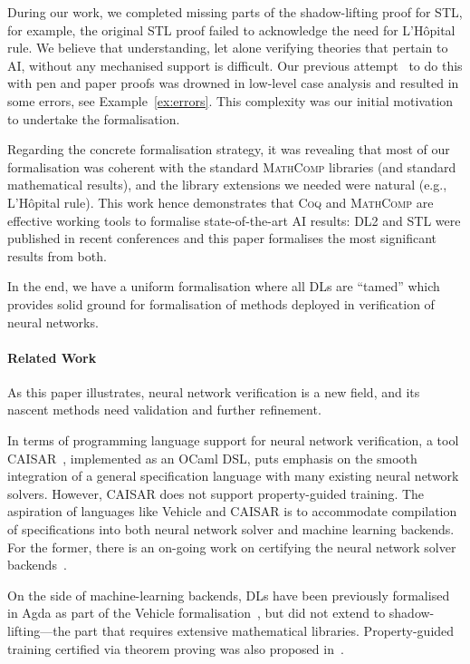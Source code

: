 \documentclass[a4paper,UKenglish,cleveref, autoref, thm-restate]{lipics-v2021}
\def\DLtwo{\textrm{DL2}}
\def\STL{\textrm{STL}}
\def\coq{\textsc{Coq}}
\def\mathcomp{\textsc{MathComp}}
\begin{document}
During our work, we completed missing parts of the shadow-lifting
proof for \STL{}, for example, the original \STL{} proof failed to
acknowledge the need for L'Hôpital rule.
%
We believe that understanding, let alone verifying theories that
pertain to AI, without any mechanised support is difficult.
%
Our previous attempt~\cite{ldl} to do this with pen and paper proofs
was drowned in low-level case analysis and resulted in some errors,
see Example~\ref{ex:errors}.  This complexity was our initial
motivation to undertake the formalisation.

Regarding the concrete formalisation strategy, it was revealing that
most of our formalisation was coherent with the standard \mathcomp{}
libraries (and standard mathematical results), and the library
extensions we needed were natural (e.g., L'Hôpital rule).  This
work hence demonstrates that \coq{} and \mathcomp{} are effective
working tools to formalise state-of-the-art AI results: \DLtwo{} and \STL{}
were published in recent conferences\cite{varnai,fischer2019dl2} and
this paper formalises the most significant results from both.

In the end, we have a uniform formalisation where all DLs are “tamed” which 
provides 
solid ground for formalisation of methods deployed in verification of neural 
networks.

\paragraph*{Related Work} 
As this paper illustrates, neural network verification is a new field,
and its nascent methods need validation and further refinement.

In terms of programming language support for neural network verification, 
a tool CAISAR~\cite{girardsatabin2022caisar}, implemented as an OCaml DSL, 
puts emphasis on the smooth integration of a general specification language 
with many existing neural network solvers. 
However, CAISAR does not support property-guided training.  
%
The aspiration of languages like Vehicle and CAISAR is to accommodate compilation
of specifications into both neural network solver and machine learning backends.
For the former, there is an on-going work on certifying the neural network 
solver backends~\cite{DesmartinIPSKK23,DaggittAKKA23}. 

On the side of machine-learning backends,
DLs have been previously formalised in Agda as part of the Vehicle formalisation~\cite{ADK24}, 
but did not extend to shadow-lifting---the part that requires extensive mathematical libraries. 
Property-guided training certified via theorem proving was also proposed in~\cite{ChevallierWF22}. 
\end{document}
